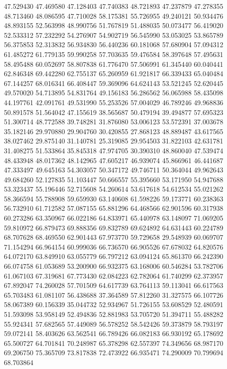 47.529430
47.469580
47.128403
47.740383
48.721893
47.237879
47.278355
48.713460
48.086595
47.710028
58.175381
55.726955
49.240121
50.934476
48.893155
52.563998
48.990756
51.767819
51.488035
50.073477
56.419020
52.533312
57.232292
54.276907
54.902719
56.545990
53.053025
53.865789
56.375853
52.313832
56.934830
56.440236
60.181068
57.680904
57.094312
61.485272
61.779135
59.990258
57.703635
59.476584
58.397648
57.495631
58.495488
60.052697
58.807838
61.776470
57.506991
61.345440
60.040441
62.846348
69.442280
62.755137
65.260959
61.921817
66.339433
65.040484
67.144257
68.016341
66.408447
59.369096
64.624143
53.521245
52.620445
49.570020
54.713895
54.831764
49.156183
56.286562
56.065988
58.435098
44.197761
42.091761
49.531990
55.253526
57.004029
46.789246
49.968836
50.891578
51.564042
47.155619
38.565687
50.479194
39.494877
57.695323
51.300714
48.772588
39.748281
31.876080
53.006123
53.572391
37.003678
35.182146
29.970880
29.904760
30.420855
27.868123
48.889487
43.617565
38.027462
29.875140
31.140781
25.319085
29.954503
31.822103
42.631781
31.408275
51.533864
35.845318
47.974705
30.390310
48.860040
47.539474
48.433948
48.017362
48.142965
47.605217
46.939074
45.866961
46.441687
47.333497
49.645163
54.303057
50.347172
49.746711
50.364044
49.962643
49.684260
52.127835
51.103447
50.666557
55.395660
53.171950
54.947688
53.323437
55.196446
52.715608
54.260614
53.617618
54.612534
55.021262
58.366594
55.788908
59.659930
63.140608
61.598226
59.173771
60.238363
56.732910
61.712582
57.087155
65.881296
64.468566
62.901596
60.317938
60.273286
63.350967
66.022186
64.833971
65.440978
63.148097
71.069205
59.810972
66.879473
69.888356
69.832789
69.624892
64.631443
60.224789
68.707628
68.469550
62.901443
67.973770
59.729658
29.548939
60.069707
71.154294
66.964154
60.999036
66.736570
66.905526
67.678032
64.820576
64.072170
63.849910
63.055779
66.797212
63.094124
65.861370
66.242390
66.074758
61.053689
53.200900
66.932375
63.168006
60.546284
53.782706
61.067103
67.319681
67.773430
62.084223
62.782064
61.740299
62.373957
67.892047
74.260028
57.701509
64.617739
63.764113
59.113041
66.617563
65.703483
61.081107
56.438688
37.364589
57.812260
31.327575
66.107726
58.067389
60.156339
35.044732
52.934967
51.726155
53.608529
52.480591
51.593098
53.958149
52.494836
52.881983
53.705720
51.394711
55.488282
55.924341
57.682565
57.449089
56.578252
58.542426
59.373879
58.793197
59.072141
58.403626
63.562541
66.789426
66.082183
66.930192
65.178692
65.500727
64.701841
70.248987
65.378298
62.557397
74.349656
68.987170
69.206750
75.365709
73.817838
72.473922
66.935471
74.290009
70.799694
68.703864

